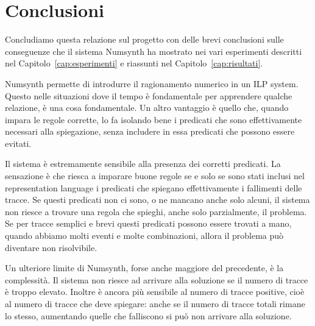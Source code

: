 \chapter{Conclusioni}
Concludiamo questa relazione sul progetto con delle brevi conclusioni sulle conseguenze che il sistema Numsynth ha mostrato nei vari esperimenti descritti nel Capitolo~\ref{cap:esperimenti} e riassunti nel Capitolo~\ref{cap:risultati}.

\myskip

Numsynth permette di introdurre il ragionamento numerico in un ILP system. Questo nelle situazioni dove il tempo è fondamentale per apprendere qualche relazione, è una cosa fondamentale. Un altro vantaggio è quello che, quando impara le regole corrette, lo fa isolando bene i predicati che sono effettivamente necessari alla spiegazione, senza includere in essa predicati che possono essere evitati.

\myskip

Il sistema è estremamente sensibile alla presenza dei corretti predicati. La sensazione è che riesca a imparare buone regole se e solo se sono stati inclusi nel representation language i predicati che spiegano effettivamente i fallimenti delle tracce. Se questi predicati non ci sono, o ne mancano anche solo alcuni, il sistema non riesce a trovare una regola che spieghi, anche solo parzialmente, il problema. Se per tracce semplici e brevi questi predicati possono essere trovati a mano, quando abbiamo molti eventi e molte combinazioni, allora il problema può diventare non risolvibile.

\myskip

Un ulteriore limite di Numsynth, forse anche maggiore del precedente, è la complessità. Il sistema non riesce ad arrivare alla soluzione se il numero di tracce è troppo elevato. Inoltre è ancora più sensibile al numero di tracce positive, cioè al numero di tracce che deve spiegare: anche se il numero di tracce totali rimane lo stesso, aumentando quelle che falliscono si può non arrivare alla soluzione.